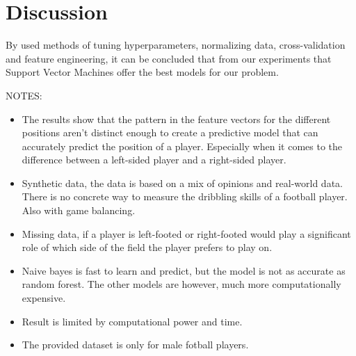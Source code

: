 \section{Discussion}

By used methods of tuning hyperparameters, normalizing data, cross-validation and feature engineering, it can be concluded that from our experiments that Support Vector Machines offer the best models for our problem. 

NOTES:
\begin{itemize}
    \item The results show that the pattern in the feature vectors for the different positions aren't distinct enough to create a predictive model that can accurately predict the position of a player. Especially when it comes to the difference between a left-sided player and a right-sided player.
    \item Synthetic data, the data is based on a mix of opinions and real-world data. There is no concrete way to measure the dribbling skills of a football player. Also with game balancing.
    \item Missing data, if a player is left-footed or right-footed would play a significant role of which side of the field the player prefers to play on.
    \item Naive bayes is fast to learn and predict, but the model is not as accurate as random forest. The other models are however, much more computationally expensive. 
    \item Result is limited by computational power and time.
    \item The provided dataset is only for male fotball players.

\end{itemize}